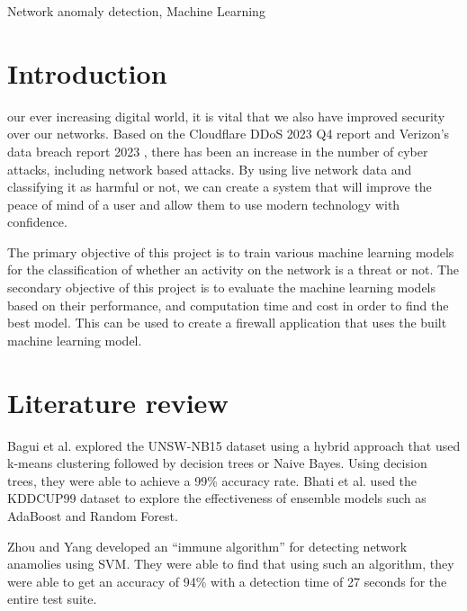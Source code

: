 \begin{IEEEkeywords}
Network anomaly detection, Machine Learning
\end{IEEEkeywords}

\IEEEpeerreviewmaketitle



\section{Introduction}

 our ever increasing digital world, it is vital that we also have improved security over our networks. Based on the Cloudflare DDoS 2023 Q4 report \cite{cloudflare} and Verizon’s data breach report 2023 \cite{verizion}, there has been an increase in the number of cyber attacks, including network based attacks. By using live network data and classifying it as harmful or not, we can create a system that will improve the peace of mind of a user and allow them to use modern technology with confidence.

The primary objective of this project is to train various machine learning models for the classification of whether an activity on the network is a threat or not. The secondary objective of this project is to evaluate the machine learning models based on their performance, and computation time and cost in order to find the best model. This can be used to create a firewall application \cite{ucar2017analysis} that uses the built machine learning model.

\section{Literature review}
Bagui et al. explored the UNSW-NB15 dataset using a hybrid approach that used k-means clustering followed by decision trees or Naive Bayes. Using decision trees, they were able to achieve a 99\% accuracy rate. \cite{bagui2019using} Bhati et al. used the KDDCUP99 dataset to explore the effectiveness of ensemble models such as AdaBoost and Random Forest. \cite{bhati2022ensemble} 

Zhou and Yang  developed an ``immune algorithm'' for detecting network anamolies using SVM. They were able to find that using such an algorithm, they were able to get an accuracy of 94\% with a detection time of 27 seconds for the entire test suite. \cite{zhou2006using}

